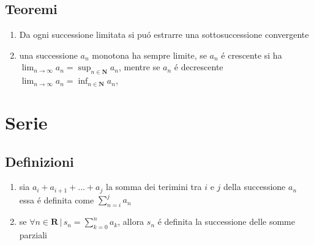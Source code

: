 \documentclass{exam}
\begin{document}
  
  
  \subsection{Teoremi}
    \begin{enumerate}
      \item Da ogni successione limitata si pu\'o estrarre una sottosuccessione convergente
      \item una successione $a_{n}$ monotona ha sempre limite, se $a_{n}$ \'e crescente si ha 
      \(\displaystyle \lim_{n\to \infty}a_{n}= \sup_{n\in \mathbf{N}}a_{n}\),
      mentre se $a_{n}$ \'e decrescente
      \(\displaystyle \lim_{n\to \infty}a_{n}= \inf_{n\in \mathbf{N}}a_{n}\),
    \end{enumerate}





\section{Serie}
 \subsection{Definizioni}
  \begin{enumerate}
    \item
      sia $a_{i}+a_{i+1}+\dots+a_{j}$ la somma dei terimini tra $i$ e $j$ della successione $a_{n}$ essa \'e definita come \(\displaystyle \sum_{n=i}^j a_{n}\)
    \item
      se \(\displaystyle \forall n\in \mathbf{R}\,|\, s_{n}=\sum_{k=0}^n a_{k}\), allora $s_{n}$ \'e definita la successione delle somme parziali
  \end{enumerate}
 
 
\end{document}

